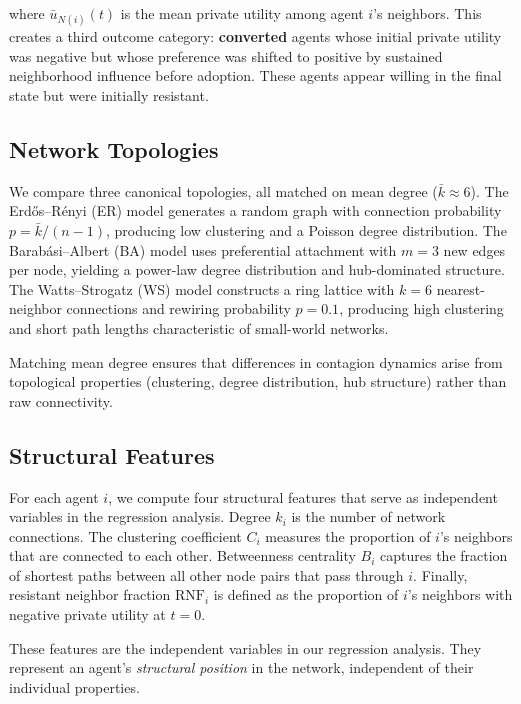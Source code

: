 \documentclass[11pt, a4paper]{article}
\newcommand{\RNF}{\text{RNF}}
\begin{document}
\noindent where $\bar{u}_{N(i)}(t)$ is the mean private utility among agent $i$'s neighbors. This creates a third outcome category: \textbf{converted} agents whose initial private utility was negative but whose preference was shifted to positive by sustained neighborhood influence before adoption. These agents appear willing in the final state but were initially resistant.

\subsection{Network Topologies}

We compare three canonical topologies, all matched on mean degree ($\bar{k} \approx 6$). The Erd\H{o}s--R\'{e}nyi (ER) model generates a random graph with connection probability $p = \bar{k}/(n-1)$, producing low clustering and a Poisson degree distribution. The Barab\'{a}si--Albert (BA) model uses preferential attachment with $m = 3$ new edges per node, yielding a power-law degree distribution and hub-dominated structure. The Watts--Strogatz (WS) model constructs a ring lattice with $k = 6$ nearest-neighbor connections and rewiring probability $p = 0.1$, producing high clustering and short path lengths characteristic of small-world networks.

Matching mean degree ensures that differences in contagion dynamics arise from topological properties (clustering, degree distribution, hub structure) rather than raw connectivity.

\subsection{Structural Features}

For each agent $i$, we compute four structural features that serve as independent variables in the regression analysis. Degree $k_i$ is the number of network connections. The clustering coefficient $C_i$ measures the proportion of $i$'s neighbors that are connected to each other. Betweenness centrality $B_i$ captures the fraction of shortest paths between all other node pairs that pass through $i$. Finally, resistant neighbor fraction $\RNF_i$ is defined as the proportion of $i$'s neighbors with negative private utility at $t = 0$.

These features are the independent variables in our regression analysis. They represent an agent's \textit{structural position} in the network, independent of their individual properties.
\end{document}
